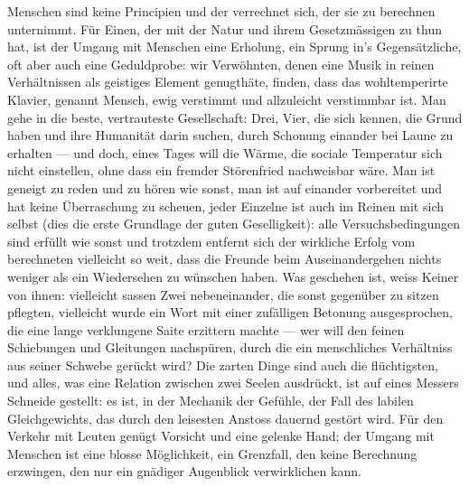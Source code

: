 Menschen sind keine Principien und der verrechnet sich, der sie zu berechnen unternimmt. Für Einen, der mit der Natur und ihrem Gesetzmässigen zu thun hat, ist der Umgang mit Menschen eine Erholung, ein Sprung in’s Gegensätzliche, oft aber auch eine Geduldprobe: wir Verwöhnten, denen eine Musik in reinen Verhältnissen als geistiges Element genugthäte, finden, dass das wohltemperirte Klavier, genannt Mensch, ewig verstimmt und allzuleicht verstimmbar ist. Man gehe in die beste, vertrauteste Gesellschaft: Drei, Vier, die sich kennen, die Grund haben und ihre Humanität darin suchen, durch Schonung einander bei Laune zu erhalten — und doch, eines Tages will die Wärme, die sociale Temperatur sich nicht einstellen, ohne dass ein fremder Störenfried nachweisbar wäre. Man ist geneigt zu reden und zu hören wie sonst, man ist auf einander vorbereitet und hat keine Überraschung zu scheuen, jeder Einzelne ist auch im Reinen mit sich selbst (dies die erste Grundlage der guten Geselligkeit): alle Versuchsbedingungen sind erfüllt wie sonst und trotzdem entfernt sich der wirkliche Erfolg vom berechneten vielleicht so weit, dass die Freunde beim Auseinandergehen nichts weniger als ein Wiedersehen zu wünschen haben. Was geschehen ist, weiss Keiner von ihnen: vielleicht sassen Zwei nebeneinander, die sonst gegenüber zu sitzen pflegten, vielleicht wurde ein Wort mit einer zufälligen Betonung ausgesprochen, die eine lange verklungene Saite erzittern machte — wer will den feinen Schiebungen und Gleitungen nachspüren, durch die ein menschliches Verhältniss aus seiner Schwebe gerückt wird? Die zarten Dinge sind auch die flüchtigsten, und alles, was eine Relation zwischen zwei Seelen ausdrückt, ist auf eines Messers Schneide gestellt: es ist, in der Mechanik der Gefühle, der Fall des labilen Gleichgewichts, das durch den leisesten Anstoss dauernd gestört wird. Für den Verkehr mit Leuten genügt Vorsicht und eine gelenke Hand; der Umgang mit Menschen ist eine blosse Möglichkeit, ein Grenzfall, den keine Berechnung erzwingen, den nur ein gnädiger Augenblick verwirklichen kann.
\par


